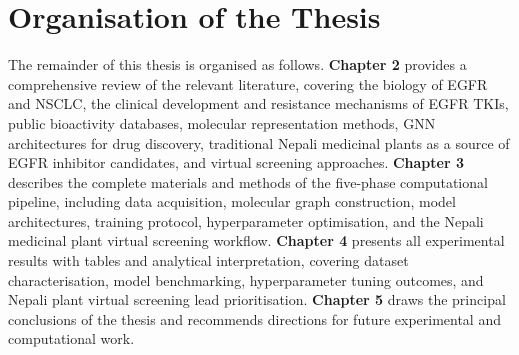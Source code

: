 \section{Organisation of the Thesis}

The remainder of this thesis is organised as follows. \textbf{Chapter 2}
provides a comprehensive review of the relevant literature, covering the biology
of EGFR and NSCLC, the clinical development and resistance mechanisms of EGFR
TKIs, public bioactivity databases, molecular representation methods, GNN
architectures for drug discovery, traditional Nepali medicinal plants as a source
of EGFR inhibitor candidates, and virtual screening approaches. \textbf{Chapter 3} describes the complete materials and methods of the
five-phase computational pipeline, including data acquisition, molecular graph
construction, model architectures, training protocol, hyperparameter optimisation,
and the Nepali medicinal plant virtual screening workflow. \textbf{Chapter 4}
presents all experimental results with tables and analytical interpretation,
covering dataset characterisation, model benchmarking, hyperparameter tuning
outcomes, and Nepali plant virtual screening lead prioritisation.
\textbf{Chapter 5} draws the principal conclusions of the thesis and recommends
directions for future experimental and computational work.